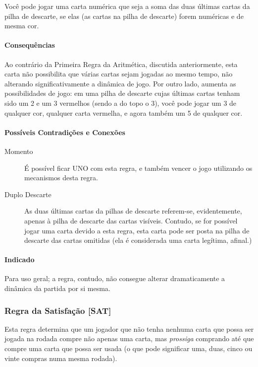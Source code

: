 Você pode jogar uma carta numérica que seja a soma das duas últimas cartas da pilha de descarte, se elas (as cartas na pilha de descarte) forem numéricas e de mesma cor.

\paragraph{Consequências}

Ao contrário da Primeira Regra da Aritmética, discutida anteriormente, esta carta não possibilita que várias cartas sejam jogadas ao mesmo tempo, não alterando significativamente a dinâmica de jogo. Por outro lado, aumenta as possibilidades de jogo: em uma pilha de descarte cujas últimas cartas tenham sido um 2 e um 3 vermelhos (sendo a do topo o 3), você pode jogar um 3 de qualquer cor, qualquer carta vermelha, e agora também um 5 de qualquer cor.

\paragraph{Possíveis Contradições e Conexões}

\begin{description}
\item[Momento]{É possível ficar UNO com esta regra, e também vencer o jogo utilizando os mecanismos desta regra.}
\item[Duplo Descarte]{As duas últimas cartas da pilhas de descarte referem-se, evidentemente, apenas à pilha de descarte das cartas visíveis. Contudo, se for possível jogar uma carta devido a esta regra, esta carta pode ser posta na pilha de descarte das cartas omitidas (ela é considerada uma carta legítima, afinal.)}
\end{description}

\paragraph{Indicado} 

Para uso geral; a regra, contudo, não consegue alterar dramaticamente a dinâmica da partida por si mesma.

\subsubsection{Regra da Satisfação [SAT]}

Esta regra determina que um jogador que não tenha nenhuma carta que possa ser jogada na rodada compre não apenas uma carta, mas \emph{prossiga} comprando até que compre uma carta que possa ser usada (o que pode significar uma, duas, cinco ou vinte compras numa mesma rodada).

